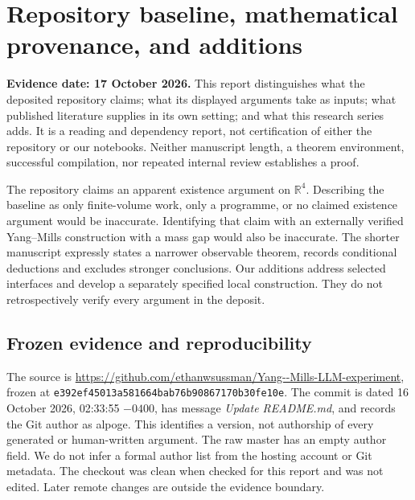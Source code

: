 \documentclass[11pt]{article}
\providecommand{\hrbpath}[1]{\nolinkurl{#1}}
\theoremstyle{remark}
\begin{document}
\providecommand{\hrbpath}[1]{\texttt{\detokenize{#1}}}

\section{Repository baseline, mathematical provenance, and additions}
\label{hrb-section}

\noindent\textbf{Evidence date: 17 October 2026.}
This report distinguishes what the deposited repository claims;
what its displayed arguments take as inputs; what published
literature supplies in its own setting; and what this research
series adds. It is a reading and dependency report, not
certification of either the repository or our notebooks.
Neither manuscript length, a theorem environment, successful
compilation, nor repeated internal review establishes a proof.

The repository claims an apparent existence argument on
\(\mathbb R^4\). Describing the baseline as only finite-volume
work, only a programme, or no claimed existence argument would
be inaccurate. Identifying that claim with an externally verified
Yang--Mills construction with a mass gap would also be inaccurate.
The shorter manuscript expressly states a narrower observable
theorem, records conditional deductions and excludes stronger
conclusions. Our additions address selected interfaces and
develop a separately specified local construction. They do not
retrospectively verify every argument in the deposit.

\subsection{Frozen evidence and reproducibility}
\label{hrb-version}

The source is
\url{https://github.com/ethanwsussman/Yang--Mills-LLM-experiment},
frozen at \hrbpath{e392ef45013a581664bab76b90867170b30fe10e}.
The commit is dated 16 October 2026, 02:33:55 \(-0400\),
has message \emph{Update README.md}, and records the Git author
as alpoge. This identifies a version, not authorship of every
generated or human-written argument. The raw master has an
empty author field. We do not infer a formal author list from
the hosting account or Git metadata. The checkout was clean
when checked for this report and was not edited. Later remote
changes are outside the evidence boundary.
\end{document}
